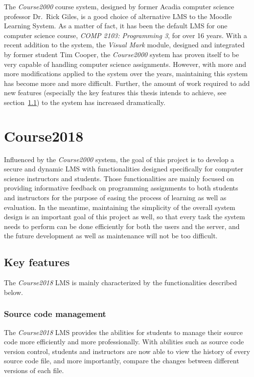 \medskip

The \emph{Course2000} course system, designed by former Acadia computer science
professor Dr.~Rick Giles, is a good choice
of alternative LMS to the Moodle Learning System.
As a matter of fact, it has been the
default LMS for one computer science course, \emph{COMP 2103: Programming 3},
for over 16 years.
With a recent addition to the system,
the \emph{Visual Mark} module,
designed and integrated by former student Tim Cooper,
the \emph{Course2000} system has proven itself
to be very capable of handling computer science assignments.
However, with more
and more modifications applied to the system over the years, maintaining
this system has become more and more difficult.
Further, the amount of work required to add new features (especially the key
features this thesis intends to achieve, see section~\ref{FEATURES}) to the system
has increased dramatically.

\section{Course2018}
Influenced by the \emph{Course2000} system, the goal of this project is to
develop a secure and dynamic LMS with functionalities designed specifically for
computer science instructors and students.
Those functionalities are mainly focused on
providing informative feedback on programming assignments to both students
and instructors for the purpose of easing the process of learning as well as
evaluation.
In the meantime, maintaining the simplicity of the overall system design 
is an important goal of this project as well,
so that every task the system needs to
perform can be done efficiently for both the users and the server,
and the future development as well as maintenance will not be too difficult.

\subsection{Key features}
\label{FEATURES}
The \emph{Course2018} LMS is mainly characterized by the functionalities
described below.

\subsubsection{Source code management}
The \emph{Course2018} LMS provides the abilities for students to manage
their source code more efficiently and more professionally. With abilities such
as source code version control, students and instructors are now able
to view the history of every source code file, and more importantly, compare
the changes between different versions of each file.

